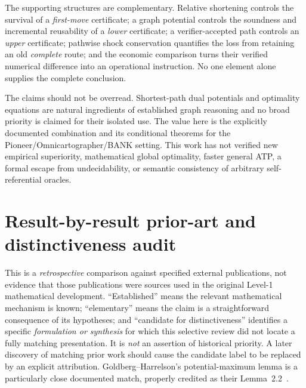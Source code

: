 \documentclass[11pt]{article}
\theoremstyle{definition}\newtheorem{definition}[theorem]{Definition}\newtheorem{assumption}[theorem]{Assumption}
\theoremstyle{remark}\newtheorem{remark}[theorem]{Remark}
\begin{document}
The supporting structures are complementary. Relative shortening controls the survival of a \emph{first-move} certificate; a graph potential controls the soundness and incremental reusability of a \emph{lower} certificate; a verifier-accepted path controls an \emph{upper} certificate; pathwise shock conservation quantifies the loss from retaining an old \emph{complete} route; and the economic comparison turns their verified numerical difference into an operational instruction. No one element alone supplies the complete conclusion.

The claims should not be overread. Shortest-path dual potentials and optimality equations are natural ingredients of established graph reasoning and no broad priority is claimed for their isolated use. The value here is the explicitly documented combination and its conditional theorems for the Pioneer/Omnicartographer/BANK setting. This work has not verified new empirical superiority, mathematical global optimality, faster general ATP, a formal escape from undecidability, or semantic consistency of arbitrary self-referential oracles.


\section{Result-by-result prior-art and distinctiveness audit}
\label{sec:priorityaudit}
This is a \emph{retrospective} comparison against specified external publications, not evidence that those publications were sources used in the original Level-1 mathematical development. ``Established'' means the relevant mathematical mechanism is known; ``elementary'' means the claim is a straightforward consequence of its hypotheses; and ``candidate for distinctiveness'' identifies a specific \emph{formulation or synthesis} for which this selective review did not locate a fully matching presentation. It is \emph{not} an assertion of historical priority. A later discovery of matching prior work should cause the candidate label to be replaced by an explicit attribution. Goldberg--Harrelson's potential-maximum lemma is a particularly close documented match, properly credited as their Lemma~2.2~\cite{GoldbergHarrelson2005}.
\end{document}
